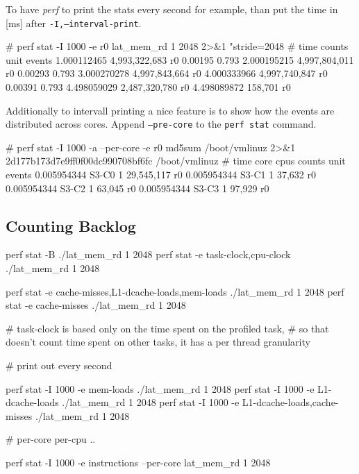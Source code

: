 \stoptyping

To have {\em perf} to print the stats every second for example, than put
the time in [ms] after {\tt -I,--interval-print}.

\starttyping
# perf stat -I 1000 -e r0 lat_mem_rd 1 2048 2>&1
"stride=2048
#           time             counts unit events
     1.000112465      4,993,322,683      r0
0.00195 0.793
     2.000195215      4,997,804,011      r0
0.00293 0.793
     3.000270278      4,997,843,664      r0
     4.000333966      4,997,740,847      r0
0.00391 0.793
     4.498059029      2,487,320,780      r0
     4.498089872            158,701      r0
\stoptyping

Additionally to intervall printing a nice feature is to show how the
events are distributed across cores. Append {\tt --pre-core} to the
{\tt perf stat} command.

\starttyping
# perf stat -I 1000 -a --per-core -e r0 md5sum /boot/vmlinuz 2>&1
2d177b173d7e9ff0f00dc990708bf6fc  /boot/vmlinuz
#           time core         cpus             counts unit events
     0.005954344 S3-C0           1         29,545,117      r0
     0.005954344 S3-C1           1             37,632      r0
     0.005954344 S3-C2           1             63,045      r0
     0.005954344 S3-C3           1             97,929      r0
\stoptyping

\subsection{Counting Backlog}

\starttyping

 perf stat -B ./lat_mem_rd 1 2048
 perf stat -e task-clock,cpu-clock ./lat_mem_rd 1 2048

 perf stat -e cache-misses,L1-dcache-loads,mem-loads ./lat_mem_rd 1 2048
 perf stat -e cache-misses ./lat_mem_rd 1 2048

 # task-clock is based only on the time spent on the profiled task,
 # so that doesn't count time spent on other tasks, it has a per thread granularity

 # print out every second

 perf stat -I 1000 -e mem-loads ./lat_mem_rd 1 2048
 perf stat -I 1000 -e L1-dcache-loads ./lat_mem_rd 1 2048
 perf stat -I 1000 -e L1-dcache-loads,cache-misses ./lat_mem_rd 1 2048

 # per-core per-cpu ..

 perf stat -I 1000 -e instructions --per-core lat_mem_rd 1 2048
\stoptyping
